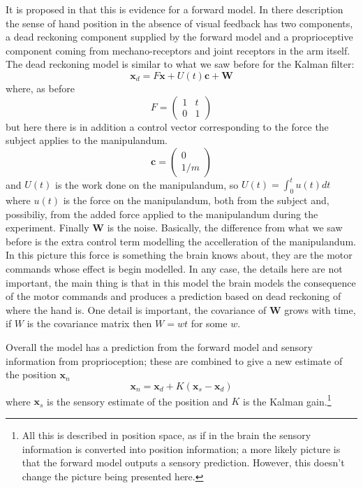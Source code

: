 \documentclass[12pt]{article}
\begin{document}
It is proposed in \cite{WolpertEtAl1995} that this is evidence for a
forward model. In there description the sense of hand position in the
absence of visual feedback has two components, a dead reckoning
component supplied by the forward model and a proprioceptive component
coming from mechano-receptors and joint receptors in the arm
itself. The dead reckoning model is similar to what we saw before for
the Kalman filter:
\begin{equation}
\mathbf{x}_d=F\textbf{x}+U(t)\textbf{c}+\textbf{W}
\end{equation}
where, as before 
\begin{equation}
F=\left(\begin{array}{cc}1&t\\0&1\end{array}\right)
\end{equation}
but here there is in addition a control vector corresponding to the
force the subject applies to the manipulandum. 
\begin{equation}
\textbf{c}=\left(\begin{array}{c} 0\\1/m\end{array}\right)
\end{equation}
and $U(t)$ is the work done on the manipulandum, so $U(t)=\int_0^t
u(t)dt$ where $u(t)$ is the force on the manipulandum, both from the
subject and, possibiliy, from the added force applied to the
manipulandum during the experiment. Finally $\textbf{W}$ is the
noise. Basically, the difference from what we saw before is the extra
control term modelling the accelleration of the manipulandum. In this
picture this force is something the brain knows about, they are the
motor commands whose effect is begin modelled. In any case, the
details here are not important, the main thing is that in this model
the brain models the consequence of the motor commands and produces a
prediction based on dead reckoning of where the hand is. One detail is
important, the covariance of $\mathbf{W}$ grows with time, if $W$ is
the covariance matrix then $W=wt$ for some $w$.

Overall the model has a prediction from the forward model and sensory information from proprioception; these are combined to give a new estimate of the position $\mathbf{x}_n$
\begin{equation}
\mathbf{x}_n=\textbf{x}_d+K(\textbf{x}_s-\textbf{x}_d)
\end{equation}
where $\mathbf{x}_s$ is the sensory estimate of the position and $K$
is the Kalman gain.\footnote{All this is described in position space,
  as if in the brain the sensory information is converted into position information; a more likely picture is that the forward model outputs a sensory prediction. However, this doesn't change the picture being presented here.}

 {}
\end{document}
